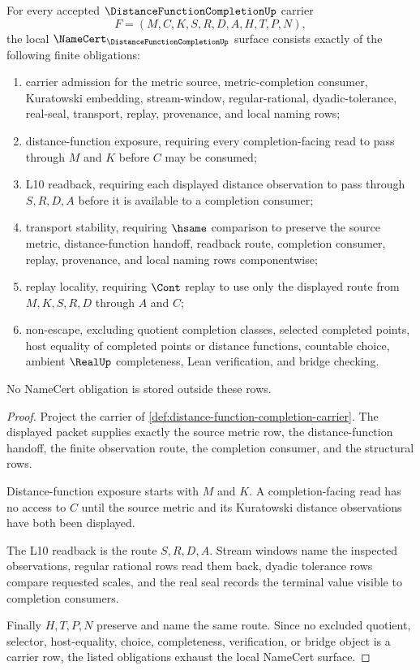 \begin{theorem}
\label{thm:distance-function-completion-namecert-obligations}
For every accepted $\DistanceFunctionCompletionUp$ carrier
$$
F=(M,C,K,S,R,D,A,H,T,P,N),
$$
the local $\NameCert_{\DistanceFunctionCompletionUp}$ surface consists exactly of the following finite obligations:
\begin{enumerate}
\item carrier admission for the metric source, metric-completion consumer, Kuratowski embedding, stream-window, regular-rational, dyadic-tolerance, real-seal, transport, replay, provenance, and local naming rows;
\item distance-function exposure, requiring every completion-facing read to pass through $M$ and $K$ before $C$ may be consumed;
\item L10 readback, requiring each displayed distance observation to pass through $S,R,D,A$ before it is available to a completion consumer;
\item transport stability, requiring $\hsame$ comparison to preserve the source metric, distance-function handoff, readback route, completion consumer, replay, provenance, and local naming rows componentwise;
\item replay locality, requiring $\Cont$ replay to use only the displayed route from $M,K,S,R,D$ through $A$ and $C$;
\item non-escape, excluding quotient completion classes, selected completed points, host equality of completed points or distance functions, countable choice, ambient $\RealUp$ completeness, Lean verification, and bridge checking.
\end{enumerate}
No NameCert obligation is stored outside these rows.
\end{theorem}
\begin{proof}
Project the carrier of \autoref{def:distance-function-completion-carrier}. The displayed packet supplies exactly the source metric row, the distance-function handoff, the finite observation route, the completion consumer, and the structural rows.

Distance-function exposure starts with $M$ and $K$. A completion-facing read has no access to $C$ until the source metric and its Kuratowski distance observations have both been displayed.

The L10 readback is the route $S,R,D,A$. Stream windows name the inspected observations, regular rational rows read them back, dyadic tolerance rows compare requested scales, and the real seal records the terminal value visible to completion consumers.

Finally $H,T,P,N$ preserve and name the same route. Since no excluded quotient, selector, host-equality, choice, completeness, verification, or bridge object is a carrier row, the listed obligations exhaust the local NameCert surface.
\end{proof}

